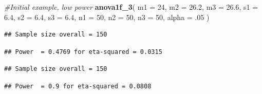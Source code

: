 \documentclass[]{book}
\newenvironment{Shaded}{\begin{snugshade}}{\end{snugshade}}
\newcommand{\CommentTok}[1]{\textcolor[rgb]{0.56,0.35,0.01}{\textit{#1}}}
\newcommand{\DataTypeTok}[1]{\textcolor[rgb]{0.13,0.29,0.53}{#1}}
\newcommand{\DecValTok}[1]{\textcolor[rgb]{0.00,0.00,0.81}{#1}}
\newcommand{\FloatTok}[1]{\textcolor[rgb]{0.00,0.00,0.81}{#1}}
\newcommand{\KeywordTok}[1]{\textcolor[rgb]{0.13,0.29,0.53}{\textbf{#1}}}
\newcommand{\NormalTok}[1]{#1}
\begin{document}
\begin{Shaded}
\begin{Highlighting}[]
\CommentTok{#Initial example, low power}
\KeywordTok{anova1f_3}\NormalTok{(}
\DataTypeTok{m1 =} \DecValTok{24}\NormalTok{,}
\DataTypeTok{m2 =} \FloatTok{26.2}\NormalTok{,}
\DataTypeTok{m3 =} \FloatTok{26.6}\NormalTok{,}
\DataTypeTok{s1 =} \FloatTok{6.4}\NormalTok{,}
\DataTypeTok{s2 =} \FloatTok{6.4}\NormalTok{,}
\DataTypeTok{s3 =} \FloatTok{6.4}\NormalTok{,}
\DataTypeTok{n1 =} \DecValTok{50}\NormalTok{,}
\DataTypeTok{n2 =} \DecValTok{50}\NormalTok{,}
\DataTypeTok{n3 =} \DecValTok{50}\NormalTok{,}
\DataTypeTok{alpha =} \FloatTok{.05}
\NormalTok{)}
\end{Highlighting}
\end{Shaded}

\begin{verbatim}
## Sample size overall = 150
\end{verbatim}

\begin{verbatim}
## Power  = 0.4769 for eta-squared = 0.0315
\end{verbatim}

\begin{Shaded}
\end{Shaded}

\begin{verbatim}
## Sample size overall = 150
\end{verbatim}

\begin{verbatim}
## Power  = 0.9 for eta-squared = 0.0808
\end{verbatim}

\begin{Shaded}
\end{Shaded}
\end{document}
